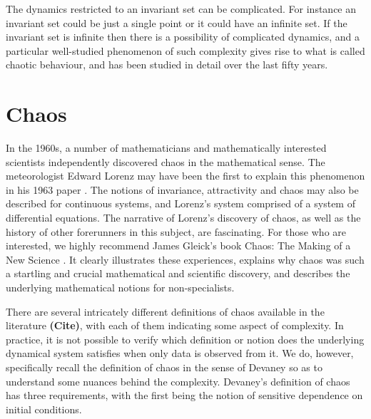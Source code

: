 \documentclass[a4paper,12pt,twoside]{report}
\begin{document}
The dynamics restricted to an invariant set can be complicated. For instance an invariant set could be just a single point or it could have an infinite set.    If the invariant set is infinite then there is a possibility of complicated dynamics, and a particular well-studied phenomenon of such complexity gives rise to what is called  chaotic behaviour, and has been studied in detail over the last fifty years.



\section{Chaos}

In the 1960s, a number of mathematicians and mathematically interested scientists independently discovered chaos in the mathematical sense. The meteorologist Edward Lorenz may have been the first to explain this phenomenon in his 1963 paper \cite{lorenz1963deterministic}. The notions of invariance, attractivity and chaos may also be described for continuous systems, and Lorenz's system comprised of a system of differential equations. The narrative of Lorenz's discovery of chaos, as well as the history of other forerunners in this subject, are fascinating. For those who are interested, we highly recommend James Gleick's book Chaos: The Making of a New Science \cite{gleick2008chaos}. It clearly illustrates these experiences, explains why chaos was such a startling and crucial mathematical and scientific discovery, and describes the underlying mathematical notions for non-specialists.

There are several intricately different definitions of chaos available in the literature \textbf{(Cite)}, with each of them indicating some aspect of complexity. %
In practice, it is not possible to verify which definition or notion does the underlying dynamical system satisfies when only data is observed from it. We do, however, specifically recall the definition of chaos in the sense of Devaney \cite{devaney2018introduction,de2013elements} so as to understand some nuances behind the complexity. Devaney's definition of chaos has three requirements, with the first being the notion  of sensitive dependence on initial conditions. 
\end{document}
